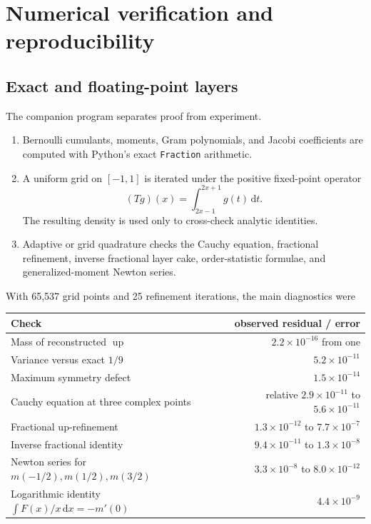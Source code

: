 \documentclass[11pt,oneside]{article}
\theoremstyle{definition}
\theoremstyle{remark}
\newcommand{\Up}{\operatorname{up}}
\newcommand{\dd}{\,\mathrm d}
\newcommand{\1}{\mathbf 1}
\begin{document}
\section{Numerical verification and reproducibility}
\label{p8:sec:numerics}

\subsection{Exact and floating-point layers}

The companion program  separates proof from
experiment.
\begin{enumerate}
\item Bernoulli cumulants, moments, Gram polynomials, and Jacobi coefficients
      are computed with Python's exact \texttt{Fraction} arithmetic.
\item A uniform grid on \([-1,1]\) is iterated under the positive fixed-point
      operator
      \[
        (Tg)(x)=\int_{2x-1}^{2x+1}g(t)\dd t.
      \]
      The resulting density is used only to cross-check analytic identities.
\item Adaptive or grid quadrature checks the Cauchy equation, fractional
      refinement, inverse fractional layer cake, order-statistic formulae, and
      generalized-moment Newton series.
\end{enumerate}

With 65,537 grid points and 25 refinement iterations, the main diagnostics were
\begin{center}
\small
\begin{tabularx}{0.95\textwidth}{@{}Xr@{}}
\toprule
Check & observed residual / error \\
\midrule
Mass of reconstructed \(\Up\) & \(2.2\times10^{-16}\) from one \\
Variance versus exact \(1/9\) & \(5.2\times10^{-11}\) \\
Maximum symmetry defect & \(1.5\times10^{-14}\) \\
Cauchy equation at three complex points & relative \(2.9\times10^{-11}\) to \(5.6\times10^{-11}\) \\
Fractional up-refinement & \(1.3\times10^{-12}\) to \(7.7\times10^{-7}\) \\
Inverse fractional identity & \(9.4\times10^{-11}\) to \(1.3\times10^{-8}\) \\
Newton series for \(m(-1/2),m(1/2),m(3/2)\) & \(3.3\times10^{-8}\) to \(8.0\times10^{-12}\) \\
Logarithmic identity \(\int F(x)/x\dd x=-m'(0)\) & \(4.4\times10^{-9}\) \\
\bottomrule
\end{tabularx}
\end{center}
\end{document}

